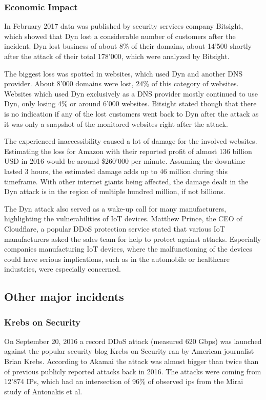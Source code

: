 	\subsubsection{Economic Impact}
	In February 2017 data was published by security services company Bitsight, which showed that Dyn lost a considerable number of customers after the incident. Dyn lost business of about 8\% of their domains, about 14'500 shortly after the attack of their total 178'000, which were analyzed by Bitsight. \cite{Varghese17}
	
The biggest loss was spotted in websites, which used Dyn and another DNS provider. About 8'000 domains were lost, 24\% of this category of websites. Websites which used Dyn exclusively as a DNS provider mostly continued to use Dyn, only losing 4\% or around 6'000 websites. Bitsight stated though that there is no indication if any of the lost customers went back to Dyn after the attack as it was only a snapshot of the monitored websites right after the attack. \cite{Varghese17}

The experienced inaccessibility caused a lot of damage for the involved websites. Estimating the loss for Amazon with their reported profit of almost 136 billion USD in 2016 \cite{Macrotrends} would be around \$260'000 per minute. Assuming the downtime lasted 3 hours, the estimated damage adds up to 46 million during this timeframe. With other internet giants being affected, the damage dealt in the Dyn attack is in the region of multiple hundred million, if not billions.

The Dyn attack also served as a wake-up call for many manufacturers, highlighting the vulnerabilities of IoT devices. Matthew Prince, the CEO of Cloudflare, a popular DDoS protection service stated that various IoT manufacturers asked the sales team for help to protect against attacks. Especially companies manufacturing IoT devices, where the malfunctioning of the devices could have serious implications, such as in the automobile or healthcare industries, were especially concerned. \cite{Melendez17}
	
	\subsection{Other major incidents}
		\subsubsection{Krebs on Security}
		On September 20, 2016 a record DDoS attack (measured 620 Gbps) was launched against the popular security blog Krebs on Security ran by American journalist Brian Krebs. According to Akamai the attack was almost bigger than twice than of previous publicly reported attacks back in 2016. \cite{Akamai16} The attacks were coming from 12'874 IPs, which had an intersection of 96\% of observed ips from the Mirai study of Antonakis et al. \cite{Antonakakis17}
	

